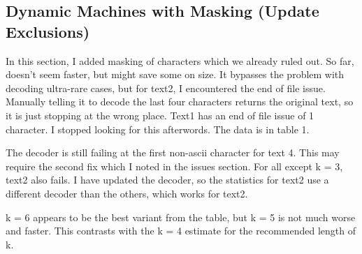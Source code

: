 \documentclass{article}
\begin{document}
\subsection{Dynamic Machines with Masking (Update Exclusions)}

In this section, I added masking of characters which we already ruled out. So far, doesn't seem faster, but might save some on size. It bypasses the problem with decoding ultra-rare cases, but for text2, I encountered the end of file issue. Manually telling it to decode the last four characters returns the original text, so it is just stopping at the wrong place. Text1 has an end of file issue of 1 character. I stopped looking for this afterwords. The data is in table 1.

The decoder is still failing at the first non-ascii character for text 4. This may require the second fix which I noted in the issues section. For all except k = 3, text2 also fails. I have updated the decoder, so the statistics for text2 use a different decoder than the others, which works for text2.

k = 6 appears to be the best variant from the table, but k = 5 is not much worse and faster. This contrasts with the k = 4 estimate for the recommended length of k.
\end{document}
